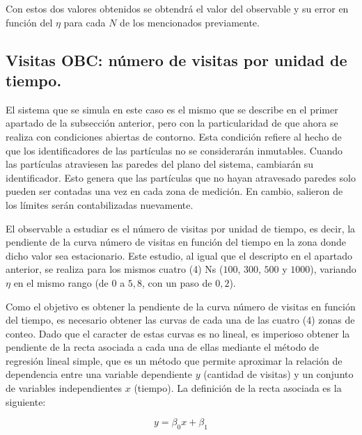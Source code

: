 \documentclass[11pt, a4paper]{article}
\begin{document}
            Con estos dos valores obtenidos se obtendrá el valor del observable y su error en función del $\eta$ para cada $N$ de los mencionados previamente.

        \subsection{Visitas OBC: número de visitas por unidad de tiempo.}
        \label{subsec:visitas-obc}

            El sistema que se simula en este caso es el mismo que se describe en el primer apartado de la subsección
            anterior, pero con la particularidad de que ahora se realiza con condiciones abiertas de contorno.
            Esta condición refiere al hecho de que los identificadores de las partículas no se considerarán inmutables.
            Cuando las partículas atraviesen las paredes del plano del sistema, cambiarán su identificador. Esto genera
            que las partículas que no hayan atravesado paredes solo pueden ser contadas una vez en cada zona de medición.
            En cambio, salieron de los límites serán contabilizadas nuevamente.

            El observable a estudiar es el número de visitas por unidad de tiempo, es decir, la pendiente de la curva
            número de visitas en función del tiempo en la zona donde dicho valor sea estacionario.
            Este estudio, al igual que el descripto en el apartado anterior, se realiza para los mismos cuatro (4) Ns
            ($100$, $300$, $500$ y $1000$), variando $\eta$ en el mismo rango (de $0$ a $5,8$, con un paso de $0,2$).

            Como el objetivo es obtener la pendiente de la curva número de visitas en función del tiempo, es necesario obtener las curvas
            de cada una de las cuatro (4) zonas de conteo.
            Dado que el caracter de estas curvas es no lineal, es imperioso obtener la pendiente de la recta asociada
            a cada una de ellas mediante el método de regresión lineal simple, que es un método que permite aproximar
            la relación de dependencia entre una variable dependiente $y$ (cantidad de visitas) y un conjunto de
            variables independientes $x$ (tiempo).
            La definición de la recta asociada es la siguiente:

            \begin{equation}
                y = \beta_0 x + \beta_1
            \end{equation}
\end{document}
